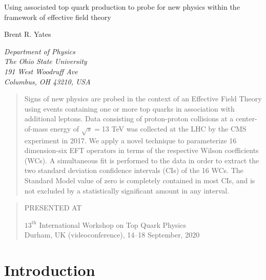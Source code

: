 \documentclass[12pt]{article}
\newcommand\pubnumber{SNSN-323-63}
\newcommand\pubdate{\today}
\def\institute{Department of Physics\\The Ohio State University\\
191 West Woodruff Ave\\
Columbus, OH 43210, USA}
\def\Title#1{\begin{center} {\Large #1 } \end{center}}
\def\Author#1{\begin{center}{ \sc #1} \end{center}}
\def\Address#1{\begin{center}{ \it #1} \end{center}}
\newcommand\pubblock{\rightline{\begin{tabular}{l} \pubnumber\\
         \pubdate  \end{tabular}}}
\newenvironment{Abstract}{\begin{quotation}  }{\end{quotation}}
\newenvironment{Presented}{\begin{quotation} \begin{center} 
             PRESENTED AT\end{center}\bigskip 
      \begin{center}\begin{large}}{\end{large}\end{center} \end{quotation}}
\begin{document}
\begin{titlepage}
\pubblock

\vfill
\Title{Using associated top quark production to probe for new physics within the framework of effective field theory}
\vfill
\Author{Brent R. Yates}
\Address{\institute}
\vfill
\begin{Abstract}
Signs of new physics are probed in the context of an Effective Field Theory using events containing one or more top quarks in association with additional leptons. Data consisting of proton-proton collisions at a center-of-mass energy of $\sqrt{s}=$13 TeV was collected at the LHC by the CMS experiment in 2017. We apply a novel technique to parameterize 16 dimension-six EFT operators in terms of the respective Wilson coefficients (WCs). A simultaneous fit is performed to the data in order to extract the two standard deviation confidence intervals (CIs) of the 16 WCs. The Standard Model value of zero is completely contained in most CIs, and is not excluded by a statistically significant amount in any interval.
\end{Abstract}
\vfill
\begin{Presented}
$13^\mathrm{th}$ International Workshop on Top Quark Physics\\
Durham, UK (videoconference), 14--18 September, 2020
\end{Presented}
\vfill
\end{titlepage}
\def\thefootnote{\fnsymbol{footnote}}
\setcounter{footnote}{0}
%

\section{Introduction}
\end{document}
